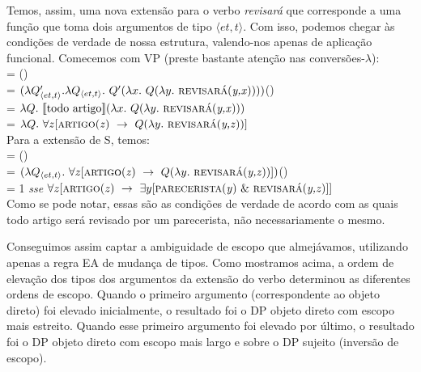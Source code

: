 \n Temos, assim, uma nova extensão para o verbo \textit{revisará} que corresponde a uma função que toma dois argumentos de tipo $\langle et,t\rangle$. Com isso, podemos chegar às condições de verdade de nossa estrutura, valendo-nos apenas de aplicação funcional. Comecemos com VP (preste bastante atenção nas conversões-$\lambda$):\\

\n {} = ()\\

\n {} = $(\lambda Q'_{\langle et,t\rangle}.\lambda Q_{\langle et,t\rangle}.\ Q'(\lambda x.\ Q(\lambda y.\ \predica{revisará}{y,x})))$()\\

\n {} = $\lambda Q.\ \llbracket \text{todo artigo} \rrbracket (\lambda x.\ Q(\lambda y.\ \predica{revisará}{y,x}))$\\

\n {} = $\lambda Q.\ \forall z [\predica{artigo}{z}\ \rightarrow\ Q(\lambda y.\ \predica{revisará}{y,z})]$\\

\n Para a extensão de S, temos:\\


\n {} = ()\\

\n {} = $(\lambda Q_{\langle et,t\rangle}.\ \forall z [\predica{artigo}{z}\ \rightarrow\ Q(\lambda y.\ \predica{revisará}{y,z})])$()\\

\n {} = 1 \textit{sse} $\forall z [\predica{artigo}{z}\ \rightarrow\ \exists y [\predica{parecerista}{y}\ \&\ \predica{revisará}{y,z}]]$\\

\n Como se pode notar, essas são as condições de verdade de acordo com as quais todo artigo será revisado por um parecerista, não necessariamente o mesmo. 

Conseguimos assim captar a ambiguidade de escopo que almejávamos, utilizando apenas a regra EA de mudança de tipos. Como mostramos acima, a ordem de elevação dos tipos dos argumentos da extensão do verbo determinou as diferentes ordens de escopo. Quando o primeiro argumento (correspondente ao objeto direto) foi elevado inicialmente, o resultado foi o DP objeto direto com escopo mais estreito. Quando esse primeiro argumento foi elevado por último, o resultado foi o DP objeto direto com escopo mais largo e sobre o DP sujeito (inversão de escopo).

